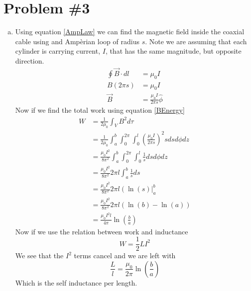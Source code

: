 \documentclass[11pt]{article}
\numberwithin{equation}{section}
\begin{document}
\section{Problem \#3}
\begin{enumerate}[(a)]
\item
Using equation \ref{AmpLaw} we can find the magnetic field inside the coaxial cable using and Amp\`{e}rian loop of radius $s$. Note we are assuming that each cylinder is carrying current, $I$, that has the same magnitude, but opposite direction.
\begin{align*}
\oint\vec{B}\cdot dl &= \mu_0 I\\
B(2\pi s) &= \mu_0 I\\
\vec{B} &= \frac{\mu_0 I}{2\pi s}\hat{\phi}
\end{align*}
Now if we find the total work using equation \ref{BEnergy}
\begin{align*}
W &= \frac{1}{2\mu_0}\int_V B^2 d\tau\\
&= \frac{1}{2\mu_0}\int_a^b\int_0^{2\pi}\int_0^l \left(\frac{\mu_0 I}{2\pi s}\right)^2 sdsd\phi dz\\
&= \frac{\mu_0 I^2}{8\pi^2}\int_a^b\int_0^{2\pi}\int_0^l \frac{1}{s} dsd\phi dz\\
&= \frac{\mu_0 I^2}{8\pi^2}2\pi l\int_a^b \frac{1}{s} ds\\
&= \frac{\mu_0 I^2}{8\pi^2}2\pi l\left(\ln(s)\right|_a^b \\
&= \frac{\mu_0 I^2}{8\pi^2}2\pi l\left(\ln(b)-\ln(a)\right) \\
&= \frac{\mu_0 I^2 l}{4\pi}\ln\left(\frac{b}{a}\right)
\end{align*}
Now if we use the relation between work and inductance
\begin{equation}
W = \frac{1}{2}LI^2
\label{WorkInduct}
\end{equation}
We see that the $I^2$ terms cancel and we are left with 
$$\frac{L}{l} = \frac{\mu_0}{2\pi}\ln\left(\frac{b}{a}\right)$$
Which is the self inductance per length.


\end{enumerate}
\end{document}
